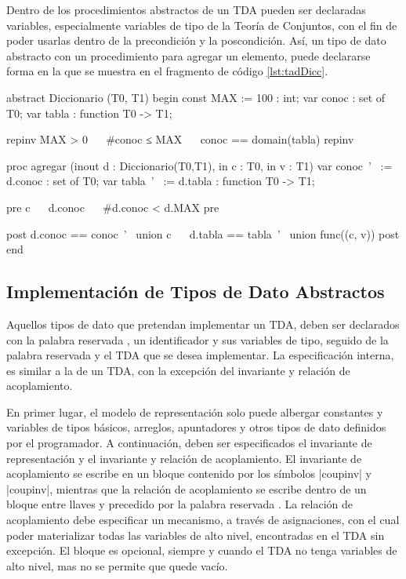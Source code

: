 Dentro de los procedimientos abstractos de un TDA pueden ser declaradas
variables, especialmente variables de tipo de la Teoría de Conjuntos, con el
fin de poder usarlas dentro de la precondición y la poscondición. Así, un tipo
de dato abstracto  con un procedimiento para agregar un
elemento, puede declararse forma en la que se muestra en el fragmento de código
\ref{lst:tadDicc}.

\begin{widegracielacode}[caption=TDA Diccionario, label=lst:tadDicc]
abstract Diccionario (T0, T1) begin
  const MAX := 100 : int;
  var   conoc      : set of T0;
  var   tabla      : function T0 -> T1;

  {repinv MAX > 0 ~\Land~ #conoc ≤ MAX ~\Land~ conoc == domain(tabla) repinv}

  proc agregar (inout d : Diccionario(T0,T1), in c : T0, in v : T1)
    var conoc~'~ := d.conoc : set of T0;
    var tabla~'~ := d.tabla : function T0 -> T1;

    {pre c ~\Notelem~ d.conoc ~\Land~ #d.conoc < d.MAX pre}

    {post  d.conoc == conoc~'~ union {c}
         ~\Land~ d.tabla == tabla~'~ union func({(c, v)}) post}
end
\end{widegracielacode}

\subsection{Implementación de Tipos de Dato Abstractos}

Aquellos tipos de dato que pretendan implementar un TDA, deben ser declarados
con la palabra reservada , un identificador y sus variables de
tipo, seguido de la palabra reservada  y el TDA que se
desea implementar. La especificación interna, es similar a la de un TDA, con la
excepción del invariante y relación de acoplamiento.

En primer lugar, el modelo de representación solo puede albergar constantes y
variables de tipos básicos, arreglos, apuntadores y otros tipos de dato
definidos por el programador. A continuación, deben ser especificados el
invariante de representación y el invariante y relación de acoplamiento. El
invariante de acoplamiento se escribe en un bloque contenido por los símbolos
\ingra|{coupinv| y \ingra|coupinv}|, mientras que la relación de
acoplamiento se escribe dentro de un bloque entre llaves y precedido por la
palabra reservada . La relación de acoplamiento debe especificar
un mecanismo, a través de asignaciones, con el cual poder materializar todas
las variables de alto nivel, encontradas en el TDA sin excepción. El bloque
 es opcional, siempre y cuando el TDA no tenga variables de alto
nivel, mas no se permite que quede vacío.

